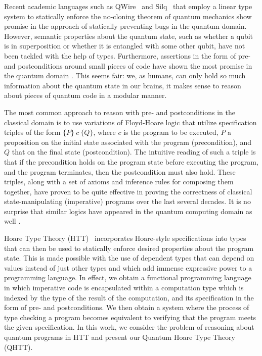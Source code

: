 \documentclass[adraft,creativecommons]{eptcs}
\newcommand{\HoareT}[3]{
    \{#1\} ~#2~ \{#3\}
}
\theoremstyle{definition}
\theoremstyle{remark}
\begin{document}
Recent academic languages such as QWire~\parencite{qwire2017,paykin2018} and Silq~\parencite{silq20} that employ a linear type system to statically enforce the no-cloning theorem of quantum mechanics show promise in the approach of statically preventing bugs in the quantum domain. However, semantic properties about the quantum state, such as whether a qubit is in superposition or whether it is entangled with some other qubit, have not been tackled with the help of types. Furthermore, assertions in the form of pre- and postconditions around small pieces of code have shown the most promise in the quantum domain \parencite{huang2019,qdb2018}. This seems fair: we, as humans, can only hold so much information about the quantum state in our brains, it makes sense to reason about pieces of quantum code in a modular manner.

The most common approach to reason with pre- and postconditions in the classical domain is to use variations of Floyd-Hoare logic that utilize specification triples of the form $\HoareT{P}{c}{Q}$, where $c$ is the program to be executed, $P$ a proposition on the initial state associated with the program (precondition), and $Q$ that on the final state (postcondition). The intuitive reading of such a triple is that if the precondition holds on the program state before executing the program, and the program terminates, then the postcondition must also hold. These triples, along with a set of axioms and inference rules for composing them together, have proven to be quite effective in proving the correctness of classical state-manipulating (imperative) programs over the last several decades. It is no surprise that similar logics have appeared in the quantum computing domain as well \parencite{aqhl2019,floydhoare2012,unruh2019,wpe2016}.

Hoare Type Theory (HTT)~\parencite{nanevski2008} incorporates Hoare-style specifications into types that can then be used to statically enforce desired properties about the program state. This is made possible with the use of dependent types that can depend on values instead of just other types and which add immense expressive power to a programming language. In effect, we obtain a functional programming language in which imperative code is encapsulated within a computation type which is indexed by the type of the result of the computation, and its specification in the form of pre- and postconditions. We then obtain a system where the process of type checking a program becomes equivalent to verifying that the program meets the given specification. In this work, we consider the problem of reasoning about quantum programs in HTT and present our Quantum Hoare Type Theory (QHTT).
\end{document}
